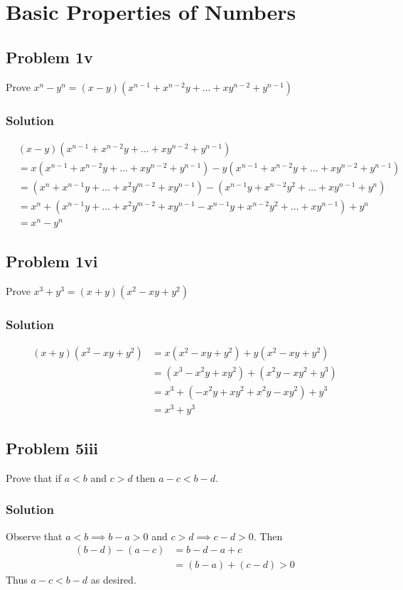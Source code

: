\section{Basic Properties of Numbers}

\subsection*{Problem 1v}
Prove $x^n-y^n=(x-y)(x^{n-1}+x^{n-2}y+\ldots+xy^{n-2}+y^{n-1})$

\subsubsection*{Solution}
\begin{align*}
    &(x-y)(x^{n-1}+x^{n-2}y+\ldots+xy^{n-2}+y^{n-1})\\
    &=x(x^{n-1}+x^{n-2}y+\ldots+xy^{n-2}+y^{n-1})-y(x^{n-1}+x^{n-2}y+\ldots+xy^{n-2}+y^{n-1})\\
    &=(x^n+x^{n-1}y+\ldots+x^2y^{m-2}+xy^{n-1})-(x^{n-1}y+x^{n-2}y^2+\ldots+xy^{n-1}+y^n)\\
    &=x^n+(x^{n-1}y+\ldots+x^2y^{m-2}+xy^{n-1}-x^{n-1}y+x^{n-2}y^2+\ldots+xy^{n-1})+y^n\\
    &=x^n-y^n
\end{align*}

\subsection*{Problem 1vi}
Prove $x^3+y^3=(x+y)(x^2-xy+y^2)$

\subsubsection*{Solution}
\begin{align*}
    (x+y)(x^2-xy+y^2)&=x(x^2-xy+y^2)+y(x^2-xy+y^2)\\
    &=(x^3-x^2y+xy^2)+(x^2y-xy^2+y^3)\\
    &=x^3+(-x^2y+xy^2+x^2y-xy^2)+y^3\\
    &=x^3+y^3
\end{align*}

\subsection*{Problem 5iii}
Prove that if $a<b$ and $c>d$ then $a-c<b-d$.

\subsubsection*{Solution}
Observe that $a<b\implies b-a>0$ and $c>d\implies c-d>0$. Then
\begin{align*}
    (b-d)-(a-c)&=b-d-a+c\\
    &=(b-a)+(c-d)>0
\end{align*}
Thus $a-c<b-d$ as desired.

